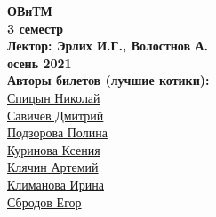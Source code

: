 


    \thispagestyle{empty}
    \BgThispage
    \begin{center}
        \vspace*{4cm}
        
        \Huge
        \textbf{ОВиТМ} \\
        \textbf{3 семестр} \\
        \textbf{Лектор: Эрлих И.Г., Волостнов А.} \\
        \textbf{осень 2021} \\
    
        
        \vspace{7cm}
        \Large
        \textbf{Авторы билетов (лучшие котики):} \\
        \href{https://vk.com/spitsynn}{Спицын Николай} \\
        \href{https://vk.com/dimasav123}{Савичев Дмитрий} \\
        \href{https://vk.com/id165779384}{Подзорова Полина} \\
        \href{https://vk.com/ksinomorph}{Куринова Ксения} \\
        \href{https://vk.com/id340504554}{Клячин Артемий} \\
        \href{https://vk.com/meraklim}{Климанова Ирина} \\
        \href{https://vk.com/ulegor}{Сбродов Егор} \\
        
    \end{center}

\newpage

\thispagestyle{empty}
\tableofcontents
\thispagestyle{empty}
\newpage





